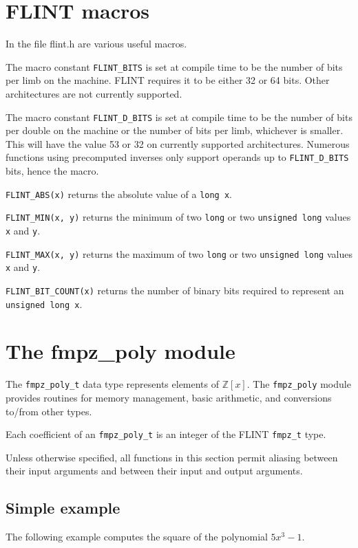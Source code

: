 \documentclass[a4paper,10pt]{article}
\newcommand{\Z}{\mathbb{Z}}
\newcommand{\code}{\lstinline}
\begin{document}
\section{FLINT macros}
In the file flint.h are various useful macros.

The macro constant \code{FLINT_BITS} is set at compile time to be the number of bits per limb on the machine. FLINT requires it to be either 32 or 64 bits. Other architectures are not currently supported.

The macro constant \code{FLINT_D_BITS} is set at compile time to be the number of bits per double on the machine or the number of bits per limb, whichever is smaller. This will have the value 53 or 32 on currently supported architectures. Numerous functions using precomputed inverses only support operands up to \code{FLINT_D_BITS} bits, hence the macro.

\code{FLINT_ABS(x)} returns the absolute value of a \code{long x}.

\code{FLINT_MIN(x, y)} returns the minimum of two \code{long} or two \code{unsigned long} values \code{x} and \code{y}.

\code{FLINT_MAX(x, y)} returns the maximum of two \code{long} or two \code{unsigned long} values \code{x} and \code{y}.

\code{FLINT_BIT_COUNT(x)} returns the number of binary bits required to represent an \code{unsigned long x}.

\section{The fmpz\_poly module}

The \code{fmpz_poly_t} data type represents elements of $\Z[x]$. The \code{fmpz_poly} module provides routines for memory management, basic arithmetic, and conversions to/from other types.

Each coefficient of an \code{fmpz_poly_t} is an integer of the FLINT \code{fmpz_t} type. 

Unless otherwise specified, all functions in this section permit aliasing between their input arguments and between their input and output arguments. 

\subsection{Simple example}

The following example computes the square of the polynomial $5x^3 - 1$.
\end{document}
